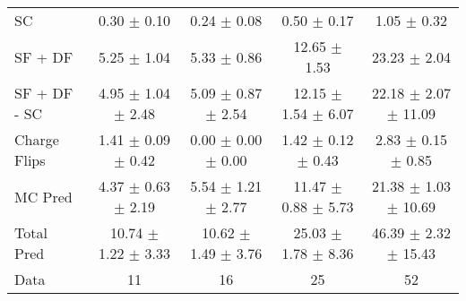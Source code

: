 \begin{tabular}{l|cccc}
                                 SC &  0.30 $\pm$  0.10 &  0.24 $\pm$  0.08 &  0.50 $\pm$  0.17 &  1.05 $\pm$  0.32 \\
                            SF + DF &  5.25 $\pm$  1.04 &  5.33 $\pm$  0.86 & 12.65 $\pm$  1.53 & 23.23 $\pm$  2.04 \\
\hline
                       SF + DF - SC &  4.95 $\pm$  1.04 $\pm$  2.48 &  5.09 $\pm$  0.87 $\pm$  2.54 & 12.15 $\pm$  1.54 $\pm$  6.07 & 22.18 $\pm$  2.07 $\pm$ 11.09 \\
\hline\hline
                       Charge Flips &  1.41 $\pm$  0.09 $\pm$  0.42 &  0.00 $\pm$  0.00 $\pm$  0.00 &  1.42 $\pm$  0.12 $\pm$  0.43 &  2.83 $\pm$  0.15 $\pm$  0.85 \\
\hline
                            MC Pred &  4.37 $\pm$  0.63 $\pm$  2.19 &  5.54 $\pm$  1.21 $\pm$  2.77 & 11.47 $\pm$  0.88 $\pm$  5.73 & 21.38 $\pm$  1.03 $\pm$ 10.69 \\
\hline
                         Total Pred & 10.74 $\pm$  1.22 $\pm$  3.33 & 10.62 $\pm$  1.49 $\pm$  3.76 & 25.03 $\pm$  1.78 $\pm$  8.36 & 46.39 $\pm$  2.32 $\pm$ 15.43 \\
\hline\hline
                               Data &    11 &    16 &    25 &    52 \\
\hline\hline
\end{tabular}

